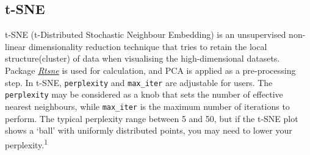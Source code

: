 \documentclass[]{article}
\begin{document}
\hypertarget{t-SNE}{%
\subsection{t-SNE}\label{t-SNE}}

t-SNE (t-Distributed Stochastic Neighbour Embedding) is an unsupervised non-linear dimensionality reduction technique that tries to retain the local structure(cluster) of data when visualising the high-dimensional datasets. Package \emph{\href{https://CRAN.R-project.org/package=Rtsne}{Rtsne}} is used for calculation, and PCA is applied as a pre-processing step. In t-SNE, \texttt{perplexity} and \texttt{max\_iter} are adjustable for users. The \texttt{perplexity} may be considered as a knob that sets the number of effective nearest neighbours, while \texttt{max\_iter} is the maximum number of iterations to perform. The typical perplexity range between 5 and 50, but if the t-SNE plot shows a `ball' with uniformly distributed points, you may need to lower your perplexity.\textsuperscript{1}
\end{document}
